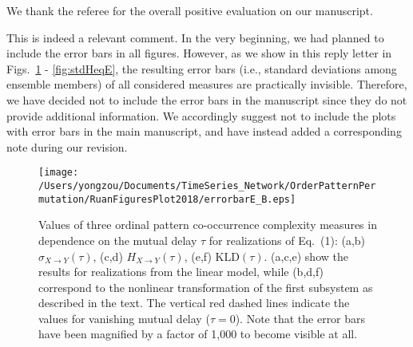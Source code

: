 \documentclass[aps,chaos,superscriptaddress,showkeys]{revtex4}
\begin{document}


\begin{center}
\begin{minipage}[c]{0.9\textwidth}
We thank the referee for the overall positive evaluation on our manuscript. 
\end{minipage}
\end{center}




\begin{center}
\begin{minipage}[c]{0.9\textwidth}
This is indeed a relevant comment. In the very beginning, we had planned to include the error bars in all figures. However, as we show in this reply letter in Figs.~\ref{fig:stdHeqB} - \ref{fig:stdHeqE}, the resulting error bars (i.e., standard deviations among ensemble members) of all considered measures are practically invisible. Therefore, we have decided not to include the error bars in the manuscript since they do not provide additional information. We accordingly suggest not to include the plots with error bars in the main manuscript, and have instead added a corresponding note during our revision.

\end{minipage}
\end{center}
\begin{figure}
	\centering
	\texttt{[image: /Users/yongzou/Documents/TimeSeries\_Network/OrderPatternPermutation/RuanFiguresPlot2018/errorbarE\_B.eps]}
\caption{Values of three ordinal pattern co-occurrence complexity measures in dependence on the mutual delay $\tau$ for realizations of Eq.~(1): (a,b) $\sigma_{X\to Y}(\tau)$, (c,d) $H_{X \to Y}(\tau)$, (e,f) $\text{KLD}(\tau)$. (a,c,e) show the results for realizations from the linear model, while (b,d,f) correspond to the nonlinear transformation of the first subsystem as described in the text. The vertical red dashed lines indicate the values for vanishing mutual delay ($\tau=0$). Note that the error bars have been magnified by a factor of 1,000 to become visible at all. \label{fig:stdHeqB}}
\end{figure}
\end{document}
